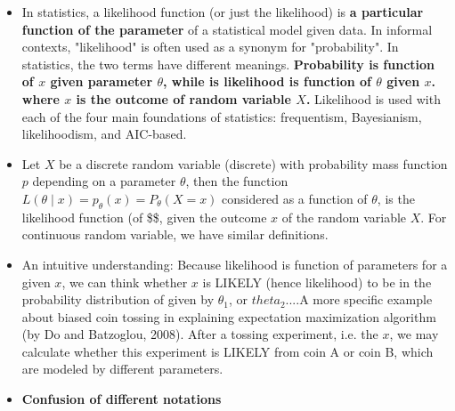 \documentclass[11pt]{article}
\begin{document}
\begin{itemize}
\item
  In statistics, a likelihood function (or just the likelihood) is
  \textbf{a particular function of the parameter} of a statistical model
  given data. In informal contexts, "likelihood" is often used as a
  synonym for "probability". In statistics, the two terms have different
  meanings. \textbf{Probability is function of \(x\) given parameter
  \(\theta\), while is likelihood is function of \(\theta\) given \(x\).
  where \(x\) is the outcome of random variable \(X\).} Likelihood is
  used with each of the four main foundations of statistics:
  frequentism, Bayesianism, likelihoodism, and AIC-based.
\item
  Let \(X\) be a discrete random variable (discrete) with probability
  mass function \(p\) depending on a parameter \(\theta\), then the
  function \(L(\theta \mid x) =p_{\theta }(x)=P_{\theta }(X=x)\)
  considered as a function of \(\theta\), is the likelihood function (of
  \$\theta \$, given the outcome \(x\) of the random variable \(X\). For
  continuous random variable, we have similar definitions.
\item
  An intuitive understanding: Because likelihood is function of
  parameters for a given \(x\), we can think whether \(x\) is LIKELY
  (hence likelihood) to be in the probability distribution of given by
  \(\theta_1\), or \(theta_2\)....A more specific example about biased
  coin tossing in explaining expectation maximization algorithm (by Do
  and Batzoglou, 2008). After a tossing experiment, i.e. the \(x\), we
  may calculate whether this experiment is LIKELY from coin A or coin B,
  which are modeled by different parameters.
\item
  \textbf{Confusion of different notations}


\end{itemize}
\end{document}
